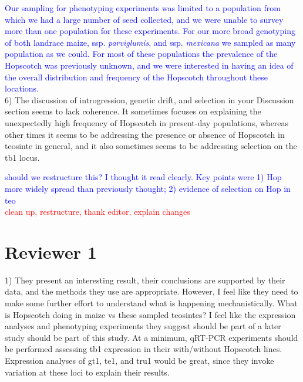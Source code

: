 \documentclass[11pt]{article}
\newcommand{\res}[1]{\noindent \textcolor{blue}{{#1}} \\}
\newcommand{\jri}[1]{\noindent \textcolor{red}{{#1}} \\}
\begin{document}
\res{Our sampling for phenotyping experiments was limited to a population from which we had a large number of seed collected, and we were unable to survey more than one population for these experiments. For our more broad genotyping of both landrace maize, ssp. \emph{parviglumis}, and ssp. \emph{mexicana} we sampled as many population as we could. For most of these populations the prevalence of the Hopscotch was previously unknown, and we were interested in having an idea of the overall distribution and frequency of the Hopscotch throughout these locations.}

6) The discussion of introgression, genetic drift, and selection in your Discussion section seems to lack coherence.  It sometimes focuses on explaining the unexpectedly high frequency of Hopscotch in present-day populations, whereas other times it seems to be addressing the presence or absence of Hopscotch in teosinte in general, and it also sometimes seems to be addressing selection on the tb1 locus. 

\res{should we restructure this? I thought it read clearly. Key points were 1) Hop more widely spread than previously thought; 2) evidence of selection on Hop in teo}
\jri{clean up, restructure, thank editor, explain changes}



\section*{Reviewer 1}



1) They present an interesting result, their conclusions are supported by their data, and the methods they use are appropriate. However, I feel like they need to make some further effort to understand what is happening mechanistically. What is Hopscotch doing in maize vs these sampled teosintes? I feel like the expression analyses and phenotyping experiments they suggest should be part of a later study should be part of this study. At a minimum, qRT-PCR experiments should be performed assessing tb1 expression in their with/without Hopscotch lines. Expression analyses of gt1, te1, and tru1 would be great, since they invoke variation at these loci to explain their results.
\end{document}
